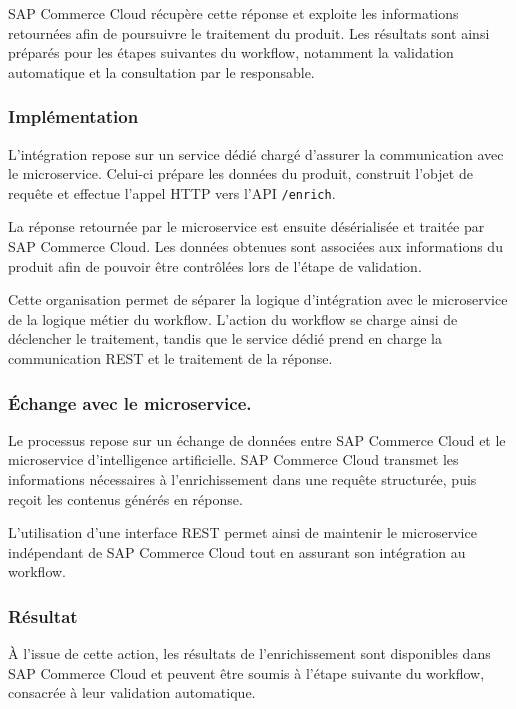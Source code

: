 SAP Commerce Cloud récupère cette réponse et exploite les informations retournées afin de poursuivre le traitement du produit. Les résultats sont ainsi préparés pour les étapes suivantes du workflow, notamment la validation automatique et la consultation par le responsable.

\subsubsection{Implémentation}

L'intégration repose sur un service dédié chargé d'assurer la communication avec le microservice. Celui-ci prépare les données du produit, construit l'objet de requête et effectue l'appel HTTP vers l'API \texttt{/enrich}.

La réponse retournée par le microservice est ensuite désérialisée et traitée par SAP Commerce Cloud. Les données obtenues sont associées aux informations du produit afin de pouvoir être contrôlées lors de l'étape de validation.

Cette organisation permet de séparer la logique d'intégration avec le microservice de la logique métier du workflow. L'action du workflow se charge ainsi de déclencher le traitement, tandis que le service dédié prend en charge la communication REST et le traitement de la réponse.

\subsubsection{Échange avec le microservice.}

Le processus repose sur un échange de données entre SAP Commerce Cloud et le microservice d'intelligence artificielle. SAP Commerce Cloud transmet les informations nécessaires à l'enrichissement dans une requête structurée, puis reçoit les contenus générés en réponse.

L'utilisation d'une interface REST permet ainsi de maintenir le microservice indépendant de SAP Commerce Cloud tout en assurant son intégration au workflow.

\subsubsection{Résultat}

À l'issue de cette action, les résultats de l'enrichissement sont disponibles dans SAP Commerce Cloud et peuvent être soumis à l'étape suivante du workflow, consacrée à leur validation automatique.

